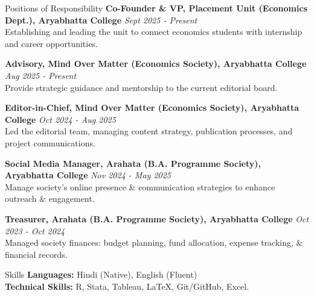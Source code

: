 \documentclass{resume} %
\begin{document}
	\begin{rSection}{Positions of Responsibility}
		\textbf{Co-Founder \& VP, Placement Unit (Economics Dept.), Aryabhatta College}
		\hfill \textit{Sept 2025 - Present} \vspace{2pt}\\
		Establishing and leading the unit to connect economics students with internship and career opportunities.
		
		\textbf{Advisory, Mind Over Matter (Economics Society), Aryabhatta College}
		\hfill \textit{Aug 2025 - Present} \vspace{2pt}\\
		Provide strategic guidance and mentorship to the current editorial board.
		
		\textbf{Editor-in-Chief, Mind Over Matter (Economics Society), Aryabhatta College}
		\hfill \textit{Oct 2024 - Aug 2025} \vspace{2pt}\\
		Led the editorial team, managing content strategy, publication processes, and project communications.
		
		\textbf{Social Media Manager, Arahata (B.A. Programme Society), Aryabhatta College}
		\hfill \textit{Nov 2024 - May 2025} \vspace{2pt}\\
		Manage society's online presence \& communication strategies to enhance outreach \& engagement.
		
		\textbf{Treasurer, Arahata (B.A. Programme Society), Aryabhatta College}
		\hfill \textit{Oct 2023 - Oct 2024} \vspace{2pt}\\
		Managed society finances: budget planning, fund allocation, expense tracking, \& financial records. 
	\end{rSection}
	
	
	\begin{rSection}{Skills}
		\textbf{Languages:} Hindi (Native), English (Fluent) \\
		\textbf{Technical Skills:} R, Stata, Tableau, LaTeX, Git/GitHub, Excel. \\
	\end{rSection}
	
	
\end{document}
